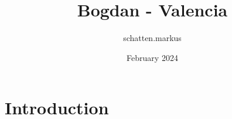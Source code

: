 \documentclass{article}
\title{Bogdan - Valencia}
\author{schatten.markus }
\date{February 2024}
\begin{document}
\maketitle

\section{Introduction}
\end{document}
